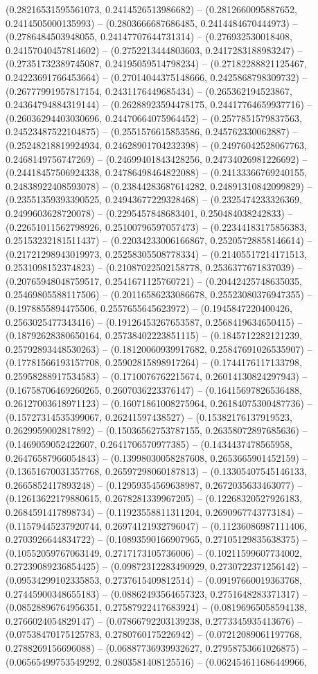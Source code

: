 (0.28216531595561073, 0.2414526513986682) -- (0.2812660095887652, 0.2414505000135993) -- (0.2803666687686485, 0.2414484670444973) -- (0.2786484503948055, 0.24147707644731314) -- (0.276932530018408, 0.24157040457814602) -- (0.2752213444803603, 0.2417283188983247) -- (0.27351732389745087, 0.24195059514798234) -- (0.27182288821125467, 0.24223691766453664) -- (0.27014044375148666, 0.2425868798309732) -- (0.26777991957817154, 0.2431176449685434) -- (0.265362194523867, 0.24364794884319144) -- (0.26288923594478175, 0.24417764659937716) -- (0.26036294403030696, 0.24470664075964452) -- (0.2577851579837563, 0.24523487522104875) -- (0.2551576615853586, 0.245762330062887) -- (0.25248218819924934, 0.24628901704232398) -- (0.24976042528067763, 0.2468149756747269) -- (0.24699401843428256, 0.24734026981226692) -- (0.24418457506924338, 0.24786498464822088) -- (0.24133366769240155, 0.24838922408593078) -- (0.23844283687614282, 0.24891310842099829) -- (0.23551359393390525, 0.24943677229328468) -- (0.2325474233326369, 0.2499603628720078) -- (0.2295457848683401, 0.250484038242833) -- (0.22651011562798926, 0.25100796597057473) -- (0.22344183175856383, 0.25153232181511437) -- (0.22034233006166867, 0.25205728858146614) -- (0.21721298943019973, 0.25258305508778334) -- (0.21405517214171513, 0.2531098152374823) -- (0.21087022502158778, 0.2536377671837039) -- (0.20765948048759517, 0.2541671125760721) -- (0.20442425748635035, 0.25469805588117506) -- (0.20116586233086678, 0.25523080376947355) -- (0.1978855894475506, 0.2557655645623972) -- (0.1945847220400426, 0.2563025477343416) -- (0.19126453267653587, 0.2568419634650415) -- (0.18792628380650164, 0.25738402223851115) -- (0.1845712282121239, 0.25792893448530263) -- (0.18120060939917682, 0.25847691026535907) -- (0.17781566193157708, 0.25902815898917264) -- (0.1744176117133798, 0.25958288917534583) -- (0.1710076762215674, 0.26014130824297943) -- (0.16758706469260265, 0.2607036223376147) -- (0.16415697826536488, 0.26127003618971123) -- (0.16071861008275964, 0.26184075300487736) -- (0.15727314535399067, 0.26241597438527) -- (0.15382176137919523, 0.2629959002817892) -- (0.15036562753787155, 0.26358072897685636) -- (0.1469059052422607, 0.2641706570977385) -- (0.1434437478565958, 0.26476587966054843) -- (0.13998030058287608, 0.2653665901452159) -- (0.13651670031357768, 0.26597298060187813) -- (0.13305407545146133, 0.2665852417893248) -- (0.12959354569638987, 0.2672035633463077) -- (0.12613622179880615, 0.2678281339967205) -- (0.12268320527926183, 0.2684591417898734) -- (0.11923558811311204, 0.2690967743773184) -- (0.11579445237920744, 0.26974121932796047) -- (0.11236086987111406, 0.2703926644834722) -- (0.10893590166907965, 0.27105129835638375) -- (0.10552059767063149, 0.2717173105736006) -- (0.10211599607734002, 0.27239089236854425) -- (0.09872312283490929, 0.2730722371256142) -- (0.09534299102335853, 0.2737615409812514) -- (0.09197660019363768, 0.27445900348655183) -- (0.08862493564657323, 0.2751648283371317) -- (0.08528896764956351, 0.27587922417683924) -- (0.08196965058594138, 0.2766024054829147) -- (0.07866792203139238, 0.2773345935413676) -- (0.07538470175125783, 0.2780760175226942) -- (0.07212089061197768, 0.2788269156696088) -- (0.06887736939932627, 0.27958753661026875) -- (0.06565499753549292, 0.2803581408125516) -- (0.062454611686449966, 